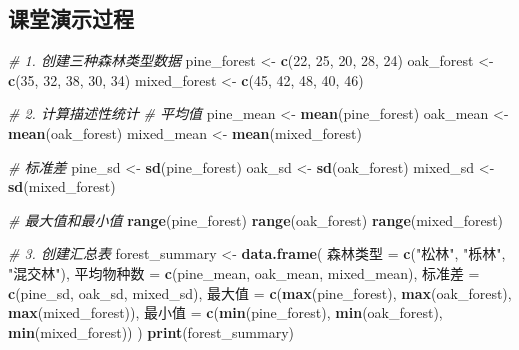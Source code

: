 \documentclass[
  twoside]{book}
\newenvironment{Shaded}{\begin{snugshade}}{\end{snugshade}}
\newcommand{\CommentTok}[1]{\textcolor[rgb]{0.56,0.35,0.01}{\textit{#1}}}
\newcommand{\DecValTok}[1]{\textcolor[rgb]{0.00,0.00,0.81}{#1}}
\newcommand{\FunctionTok}[1]{\textcolor[rgb]{0.13,0.29,0.53}{\textbf{#1}}}
\newcommand{\NormalTok}[1]{#1}
\newcommand{\OtherTok}[1]{\textcolor[rgb]{0.56,0.35,0.01}{#1}}
\newcommand{\StringTok}[1]{\textcolor[rgb]{0.31,0.60,0.02}{#1}}
\begin{document}
\hypertarget{ux8bfeux5802ux6f14ux793aux8fc7ux7a0b-6}{%
\subsection{课堂演示过程}\label{ux8bfeux5802ux6f14ux793aux8fc7ux7a0b-6}}

\begin{Shaded}
\begin{Highlighting}[]
\CommentTok{\# 1. 创建三种森林类型数据}
\NormalTok{pine\_forest }\OtherTok{\textless{}{-}} \FunctionTok{c}\NormalTok{(}\DecValTok{22}\NormalTok{, }\DecValTok{25}\NormalTok{, }\DecValTok{20}\NormalTok{, }\DecValTok{28}\NormalTok{, }\DecValTok{24}\NormalTok{)}
\NormalTok{oak\_forest }\OtherTok{\textless{}{-}} \FunctionTok{c}\NormalTok{(}\DecValTok{35}\NormalTok{, }\DecValTok{32}\NormalTok{, }\DecValTok{38}\NormalTok{, }\DecValTok{30}\NormalTok{, }\DecValTok{34}\NormalTok{)  }
\NormalTok{mixed\_forest }\OtherTok{\textless{}{-}} \FunctionTok{c}\NormalTok{(}\DecValTok{45}\NormalTok{, }\DecValTok{42}\NormalTok{, }\DecValTok{48}\NormalTok{, }\DecValTok{40}\NormalTok{, }\DecValTok{46}\NormalTok{)}

\CommentTok{\# 2. 计算描述性统计}
\CommentTok{\# 平均值}
\NormalTok{pine\_mean }\OtherTok{\textless{}{-}} \FunctionTok{mean}\NormalTok{(pine\_forest)}
\NormalTok{oak\_mean }\OtherTok{\textless{}{-}} \FunctionTok{mean}\NormalTok{(oak\_forest)}
\NormalTok{mixed\_mean }\OtherTok{\textless{}{-}} \FunctionTok{mean}\NormalTok{(mixed\_forest)}

\CommentTok{\# 标准差}
\NormalTok{pine\_sd }\OtherTok{\textless{}{-}} \FunctionTok{sd}\NormalTok{(pine\_forest)}
\NormalTok{oak\_sd }\OtherTok{\textless{}{-}} \FunctionTok{sd}\NormalTok{(oak\_forest)}
\NormalTok{mixed\_sd }\OtherTok{\textless{}{-}} \FunctionTok{sd}\NormalTok{(mixed\_forest)}

\CommentTok{\# 最大值和最小值}
\FunctionTok{range}\NormalTok{(pine\_forest)}
\FunctionTok{range}\NormalTok{(oak\_forest)}
\FunctionTok{range}\NormalTok{(mixed\_forest)}

\CommentTok{\# 3. 创建汇总表}
\NormalTok{forest\_summary }\OtherTok{\textless{}{-}} \FunctionTok{data.frame}\NormalTok{(}
\NormalTok{  森林类型 }\OtherTok{=} \FunctionTok{c}\NormalTok{(}\StringTok{"松林"}\NormalTok{, }\StringTok{"栎林"}\NormalTok{, }\StringTok{"混交林"}\NormalTok{),}
\NormalTok{  平均物种数 }\OtherTok{=} \FunctionTok{c}\NormalTok{(pine\_mean, oak\_mean, mixed\_mean),}
\NormalTok{  标准差 }\OtherTok{=} \FunctionTok{c}\NormalTok{(pine\_sd, oak\_sd, mixed\_sd),}
\NormalTok{  最大值 }\OtherTok{=} \FunctionTok{c}\NormalTok{(}\FunctionTok{max}\NormalTok{(pine\_forest), }\FunctionTok{max}\NormalTok{(oak\_forest), }\FunctionTok{max}\NormalTok{(mixed\_forest)),}
\NormalTok{  最小值 }\OtherTok{=} \FunctionTok{c}\NormalTok{(}\FunctionTok{min}\NormalTok{(pine\_forest), }\FunctionTok{min}\NormalTok{(oak\_forest), }\FunctionTok{min}\NormalTok{(mixed\_forest))}
\NormalTok{)}
\FunctionTok{print}\NormalTok{(forest\_summary)}


\end{Highlighting}
\end{Shaded}
\end{document}
